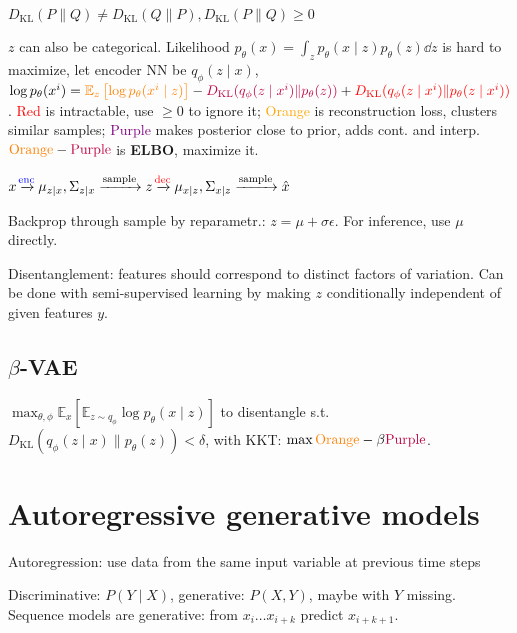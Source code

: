 \documentclass[11pt,landscape,a4paper,fleqn]{article}
\newcommand{\kl}[2]{D_{\mathrm{KL}}(#1\lVert#2)}
\newcommand{\E}{\mathbb{E}}
\begin{document}
\begin{multicols*}{4}
$\kl{P}{Q} \neq \kl{Q}{P}, \kl{P}{Q} \geq 0$

$z$ can also be categorical.
Likelihood $p_\theta(x) = \int_z p_\theta(x \mid z) p_\theta(z) \dd z$ is hard to maximize,
let encoder NN be $q_\phi(z \mid x)$,
$\log p_\theta(x^{i}) = \textcolor{orange}{\E_z\left[\log p_\theta(x^{i} \mid z)\right]}
- \textcolor{purple}{\kl{q_\phi(z \mid x^{i})}{p_\theta(z)}} + \textcolor{red}{\kl{q_\phi(z \mid x^{i})}{p_\theta(z \mid x^{i})}}$.
\textcolor{red}{Red} is intractable, use $\geq 0$ to ignore it;
\textcolor{orange}{Orange} is reconstruction loss, clusters similar samples;
\textcolor{purple}{Purple} makes posterior close to prior, adds cont. and interp.
$\mathrm{\textcolor{orange}{Orange}} - \mathrm{\textcolor{purple}{Purple}}$ is \textbf{ELBO}, maximize it.

$x \xrightarrow{\mathrm{\makebox[0pt]{\scriptsize \textcolor{blue}{enc}}}} \mu_{z \mid x}, \Sigma_{z \mid x} \xrightarrow{\mathrm{sample}} z \xrightarrow{\mathrm{\makebox[0pt]{\scriptsize \textcolor{red}{dec}}}} \mu_{x \mid z}, \Sigma_{x \mid z}  \xrightarrow{\mathrm{sample}} \hat{x}$

Backprop through sample by reparametr.: $z = \mu + \sigma \epsilon$.
For inference, use $\mu$ directly.

Disentanglement: features should correspond to distinct factors of variation.
Can be done with semi-supervised learning by making $z$ conditionally independent of given features $y$.

\subsection{$\beta$-VAE}

$\max_{\theta, \phi} \E_x\left[\E_{z \sim q_\phi} \log p_\theta(x \mid z)\right]$
to disentangle s.t.
$\kl{q_\phi(z \mid x)}{p_\theta(z)} < \delta$, with KKT: $\max \textcolor{orange}{\mathrm{Orange}} - \beta\textcolor{purple}{\mathrm{Purple}}$.

\section{Autoregressive generative models}

Autoregression: use data from the same input variable at previous time steps

Discriminative: $P(Y \mid X)$, generative: $P(X, Y)$, maybe with $Y$ missing.
Sequence models are generative: from $x_i \dots x_{i + k}$ predict $x_{i + k + 1}$.


\end{multicols*}
\end{document}
